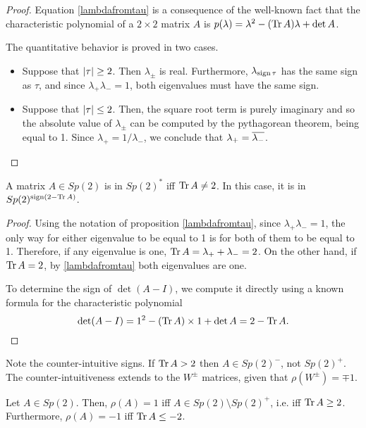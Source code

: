 \begin{proof}
Equation \eqref{lambdafromtau} is a consequence of the well-known fact that the characteristic polynomial of a $2 \times 2$ matrix $A$ is $p(\lambda) = \lambda^2 - (\operatorname{Tr} A) \lambda + \det A$.

The quantitative behavior is proved in two cases.
\begin{itemize}
\item Suppose that $\lvert\tau\rvert \geq 2$. Then $\lambda_\pm$ is real. Furthermore, $\lambda_{\operatorname{sign} \tau}$ has the same sign as $\tau$, and since $\lambda_+ \lambda_- = 1$, both eigenvalues must have the same sign.
\item Suppose that $\lvert\tau\rvert \leq 2$. Then, the square root term is purely imaginary and so the absolute value of $\lambda_\pm$ can be computed by the pythagorean theorem, being equal to 1. Since $\lambda_+ = 1/\lambda_-$, we conclude that $\lambda_+ = \overline{\lambda_-}$.
\end{itemize}
\end{proof}

\begin{corollary}\label{sp2sgn}
A matrix $A \in Sp(2)$ is in $Sp(2)^*$ iff $\operatorname{Tr} A \neq 2$. In this case, it is in $Sp(2)^{\operatorname{sign}(2 - \operatorname{Tr} A)}$.
\end{corollary}

\begin{proof}
Using the notation of proposition \ref{lambdafromtau}, since $\lambda_+ \lambda_- = 1$, the only way for either eigenvalue to be equal to 1 is for both of them to be equal to 1. Therefore, if any eigenvalue is one, $\operatorname{Tr} A = \lambda_+ + \lambda_- = 2$. On the other hand, if $\operatorname{Tr} A = 2$, by \eqref{lambdafromtau} both eigenvalues are one.

To determine the sign of $\det(A-I)$, we compute it directly using a known formula for the characteristic polynomial
\begin{equation}
\det(A-I) = 1^2 - (\operatorname{Tr} A) \times 1 + \det A = 2 - \operatorname{Tr} A.
\end{equation}
\end{proof}

\begin{remark}
Note the counter-intuitive signs. If $\operatorname{Tr} A > 2$ then $A \in Sp(2)^-$, not $Sp(2)^+$. The counter-intuitiveness extends to the $W^\pm$ matrices, given that $\rho(W^\pm) = \mp 1$.
\end{remark}

\begin{corollary}\label{sp2pm}
Let $A \in Sp(2)$. Then, $\rho(A) = 1$ iff $A \in Sp(2) \setminus Sp(2)^+$, i.e. iff $\operatorname{Tr} A \geq 2$. Furthermore, $\rho(A) = -1$ iff $\operatorname{Tr} A \leq -2$.
\end{corollary}


